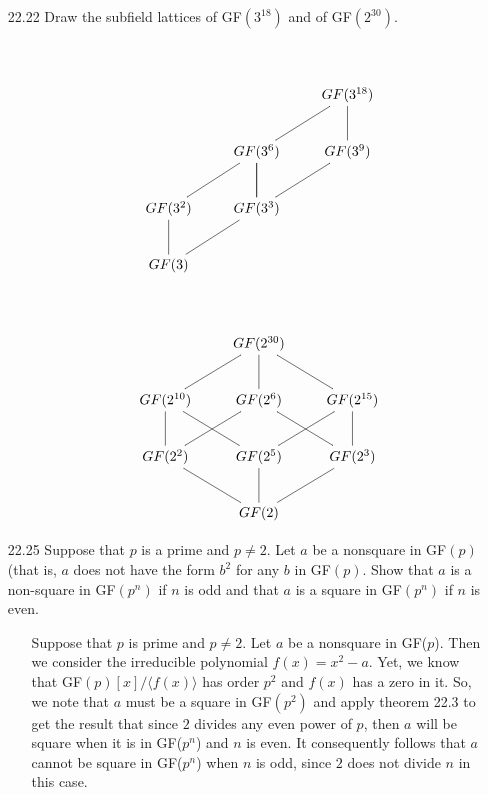 \documentclass[12pt]{article}
\begin{document}
\begin{enumerate}
\item[22.22] Draw the subfield lattices of GF$(3^{18})$ and of GF$(2^{30})$.
\begin{enumerate}
\item[] 
\begin{displaymath}
\xymatrix{
&&&&\\
&&& GF(3^{18}) & \\
&&
GF(3^6) \ar@{-}[d] \ar@{-}[ur] &
GF(3^9) \ar@{-}[u] & \\
&
GF(3^2) \ar@{-}[ur] &
GF(3^3) \ar@{-}[ur] \ar@{-}[u] &
& 
\\
&GF(3) \ar@{-}[u] \ar@{-}[ur]&& &\\
}
\end{displaymath}

\begin{displaymath}
\xymatrix{
&&&&\\
&&GF(2^{30})&& \\
&
GF(2^{10}) \ar@{-}[ur]
&
GF(2^6) \ar@{-}[u] \ar@{-}[dl] \ar@{-}[dr]
&
GF(2^{15}) \ar@{-}[ul] & \\
&
GF(2^2) \ar@{-}[u] &
GF(2^5) \ar@{-}[ul] \ar@{-}[ur]
& GF(2^3) \ar@{-}[u]  & \\
&&GF(2) \ar@{-}[u] \ar@{-}[ul] \ar@{-}[ur]& &\\
}
\end{displaymath}
\end{enumerate}

\item[22.25] Suppose that $p$ is a prime and $p \neq 2$. Let $a$ be a nonsquare in GF$(p)$ 
(that is, $a$ does not have the form $b^2$ for any $b$ in GF$(p)$. Show that $a$ is a 
non-square in GF$(p^n)$ if $n$ is odd and that $a$ is a square in GF$(p^n)$ if $n$ is even.
\begin{enumerate}
\item[] Suppose that $p$ is prime and $p \neq 2$. Let $a$ be a nonsquare in GF($p$). Then
we consider the irreducible polynomial $f(x) = x^2 - a$. Yet, we know that
GF$(p)[x]/\langle f(x)\rangle$ has order $p^2$ and $f(x)$ has a zero in it. 
So, we note that $a$ must be a square in GF$(p^2)$ and apply theorem 22.3 to get the result
that since $2$ divides any even power of $p$, then $a$ will be square when it is in 
GF($p^n$) and $n$ is even. It consequently follows that $a$ cannot be square in 
GF($p^n$) when $n$ is odd, since $2$ does not divide $n$ in this case.
\end{enumerate}


\end{enumerate}
\end{document}
